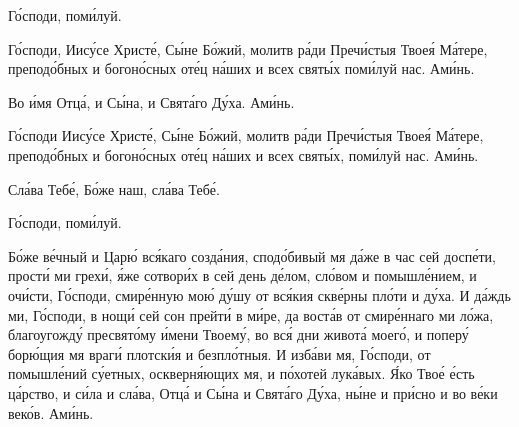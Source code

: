 \begin{mymulticols}
\slavainynen

Г\'{о}споди, пом\'{и}луй. 

Г\'{о}споди, Иис\'{у}се Христ\'{е}, С\'{ы}не Б\'{о}жий, молитв р\'{а}ди Преч\'{и}стыя Твое\'{я} М\'{а}тере, препод\'{о}бных и богон\'{о}сных от\'{е}ц н\'{а}ших и всех свят\'{ы}х пом\'{и}луй нас. Ам\'{и}нь.

\end{mymulticols}

\mychapterending


\begin{mymulticols}


Во \'{и}мя Отц\'{а}, и С\'{ы}на, и Свят\'{а}го Д\'{у}ха. Ам\'{и}нь.

Г\'{о}споди Иис\'{у}се Христ\'{е}, С\'{ы}не Б\'{о}жий, молитв р\'{а}ди Преч\'{и}стыя Твое\'{я} М\'{а}тере, препод\'{о}бных и богон\'{о}сных от\'{е}ц н\'{а}ших и всех свят\'{ы}х, пом\'{и}луй нас. Ам\'{и}нь.

Сл\'{а}ва Теб\'{е}, Б\'{о}же наш, сл\'{а}ва Теб\'{е}.

\TsariuNebesnyj

\TrisviatoePoOtcheNash


\TroparPomilujNas

Г\'{о}споди, пом\'{и}луй. 


Б\'{о}же в\'{е}чный и Цар\'{ю} вс\'{я}каго созд\'{а}ния, спод\'{о}бивый мя д\'{а}же в час сей досп\'{е}ти, прост\'{и} ми грех\'{и}, \'{я}же сотвор\'{и}х в сей день д\'{е}лом, сл\'{о}вом и помышл\'{е}нием, и оч\'{и}сти, Г\'{о}споди, смир\'{е}нную мо\'{ю} д\'{у}шу от вс\'{я}кия скв\'{е}рны пл\'{о}ти и д\'{у}ха. И д\'{а}ждь ми, Г\'{о}споди, в нощ\'{и} сей сон прейт\'{и} в м\'{и}ре, да вост\'{а}в от смир\'{е}ннаго ми л\'{о}жа, благоугожд\'{у} пресвят\'{о}му \'{и}мени Твоем\'{у}, во вс\'{я} дни живот\'{а} моег\'{о}, и попер\'{у} бор\'{ю}щия мя враг\'{и} плотск\'{и}я и безпл\'{о}тныя. И изб\'{а}ви мя, Г\'{о}споди, от помышл\'{е}ний с\'{у}етных, оскверн\'{я}ющих мя, и п\'{о}хотей лук\'{а}вых. \'{Я}ко Тво\'{е} \'{е}сть ц\'{а}рство, и с\'{и}ла и сл\'{а}ва, Отц\'{а} и С\'{ы}на и Свят\'{а}го Д\'{у}ха, н\'{ы}не и пр\'{и}сно и во в\'{е}ки век\'{о}в. Ам\'{и}нь.



\end{mymulticols}
